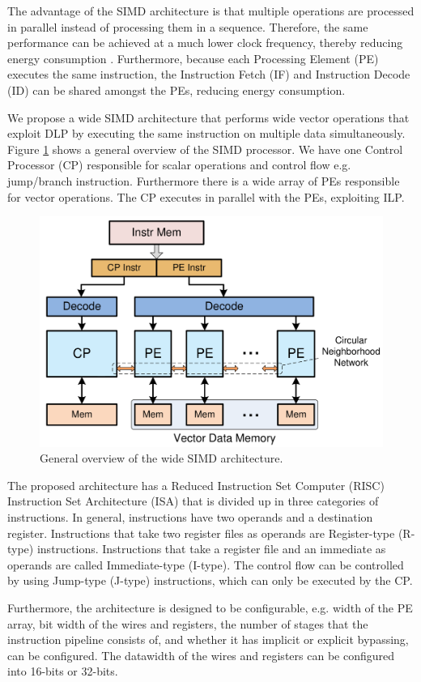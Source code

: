The advantage of the SIMD architecture is that multiple operations are processed in parallel instead of processing them in a sequence. Therefore, the same performance can be achieved at a much lower clock frequency, thereby reducing energy consumption \cite{dongrio1}. Furthermore, because each Processing Element (PE) executes the same instruction, the Instruction Fetch (IF) and Instruction Decode (ID) can be shared amongst the PEs, reducing energy consumption.

We propose a wide SIMD architecture \cite{simd} that performs wide vector operations that exploit DLP by executing the same instruction on multiple data simultaneously. Figure \ref{fig:simd_overview} shows a general overview of the SIMD processor.
We have one Control Processor (CP) responsible for scalar operations and control flow e.g. jump/branch instruction. Furthermore there is a wide array of PEs responsible for vector operations. The CP executes in parallel with the PEs, exploiting ILP.

\begin{figure}[H]
\centering
\includegraphics[width=.6\textwidth]{figures/simd_overview}
\caption{General overview of the wide SIMD architecture.}
\label{fig:simd_overview}
\end{figure}

The proposed architecture has a Reduced Instruction Set Computer (RISC) Instruction Set Architecture (ISA) that is divided up in three categories of instructions. In general, instructions have two operands and a destination register. Instructions that take two register files as operands are Register-type (R-type) instructions. Instructions that take a register file and an immediate as operands are called Immediate-type (I-type). The control flow can be controlled by using Jump-type (J-type) instructions, which can only be executed by the CP.

Furthermore, the architecture is designed to be configurable, e.g. width of the PE array, bit width of the wires and registers, the number of stages that the instruction pipeline consists of, and whether it has implicit or explicit bypassing, can be configured. The datawidth of the wires and registers can be configured into 16-bits or 32-bits.

